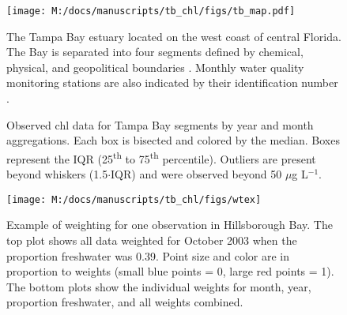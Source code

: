 \documentclass{svjour3}\usepackage[]{graphicx}\usepackage[]{color}
\newcommand{\mugl}{$\mu$g L$^{-1}$}
\begin{document}
\clearpage


\begin{figure}
\centering
\texttt{[image: M:/docs/manuscripts/tb\_chl/figs/tb\_map.pdf]}
\caption{The Tampa Bay estuary located on the west coast of central Florida. The Bay is separated into four segments defined by chemical, physical, and geopolitical boundaries \cite{Lewis85}. Monthly water quality monitoring stations are also indicated by their identification number \cite{Boler01}.}
\label{fig:tb_map}
\end{figure}


\begin{figure}
\centering
{}


\leavevmode\smash{\makebox[0pt]{\hspace{0em}%
  \rotatebox[origin=l]{90}{\hspace{19em}%
    Chlorophyll-\textit{a} (\mugl)}%
}}\hspace{0pt plus 1filll}\null

\caption{Observed \ac{chl} data for Tampa Bay segments by \protect{} year and \protect{} month aggregations.  Each box is bisected and colored by the median.  Boxes represent the \ac{IQR} (25\textsuperscript{th} to 75\textsuperscript{th} percentile).  Outliers are present beyond whiskers (1.5$\cdot$\ac{IQR}) and were observed beyond 50 \mugl.}
\label{fig:obsyrmo}
\end{figure}

\begin{figure}[!ht]


{\centering \texttt{[image: M:/docs/manuscripts/tb\_chl/figs/wtex]} 

}

\caption[Example of weighting for one observation in Hillsborough Bay]{Example of weighting for one observation in Hillsborough Bay.  The top plot shows all data weighted for October 2003 when the proportion freshwater was 0.39.  Point size and color are in proportion to weights (small blue points = 0, large red points = 1).  The bottom plots show the individual weights for month, year, proportion freshwater, and all weights combined.\label{fig:wtex}}
\end{figure}
\end{document}
